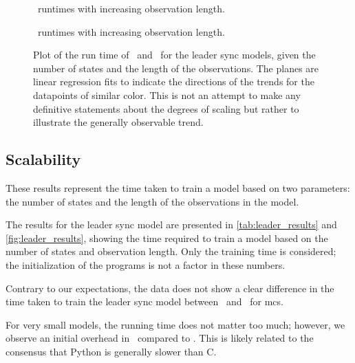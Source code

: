 \begin{figure}
    
    \caption{\Cupaal\ runtimes with increasing observation length.}
    \label{fig:cupaal-length-to-runtime}
\end{figure}


\begin{figure}
    
    \caption{\Jajapy\ runtimes with increasing observation length.}
    \label{fig:jajapy-length-to-runtime}
\end{figure}


\begin{figure*}
    \centering
    
    \caption{Plot of the run time of \Jajapy\ and \Cupaal\ for the leader sync models, given the number of states and the length of the observations. The planes are linear regression fits to indicate the directions of the trends for the datapoints of similar color. This is not an attempt to make any definitive statements about the degrees of scaling but rather to illustrate the generally observable trend.}
    \label{fig:leader_results}
\end{figure*}






\subsection{Scalability}\label{subsec:scalability}
These results represent the time taken to train a model based on two parameters: the number of states and the length of the observations in the model.

The results for the leader sync model are presented in \autoref{tab:leader_results} and \autoref{fig:leader_results}, showing the time required to train a model based on the number of states and observation length. Only the training time is considered; the initialization of the programs is not a factor in these numbers.

Contrary to our expectations, the data does not show a clear difference in the time taken to train the leader sync model between \Jajapy\ and \Cupaal\ for \glspl{mc}.

For very small models, the running time does not matter too much; however, we observe an initial overhead in \Jajapy\ compared to \Cupaal. This is likely related to the consensus that Python is generally slower than C.

